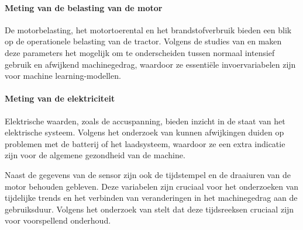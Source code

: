 \paragraph{Meting van de belasting van de motor}
De motorbelasting, het motortoerental en het brandstofverbruik bieden een blik op de operationele belasting van de tractor. Volgens de studies van \textcite{Chen2025} en \textcite{Mahale2025} maken deze parameters het mogelijk om te onderscheiden tussen normaal intensief gebruik en afwijkend machinegedrag, waardoor ze essentiële invoervariabelen zijn voor machine learning-modellen.


\paragraph{Meting van de elektriciteit}
Elektrische waarden, zoals de accuspanning, bieden inzicht in de staat van het elektrische systeem. Volgens het onderzoek van \textcite{Chen2025} kunnen afwijkingen duiden op problemen met de batterij of het laadsysteem, waardoor ze een extra indicatie zijn voor de algemene gezondheid van de machine.


Naast de gegevens van de sensor zijn ook de tijdstempel en de draaiuren van de motor behouden gebleven. Deze variabelen zijn cruciaal voor het onderzoeken van tijdelijke trends en het verbinden van veranderingen in het machinegedrag aan de gebruiksduur. Volgens het onderzoek van \textcite{Xue2025} stelt dat deze tijdsreeksen cruciaal zijn voor voorspellend onderhoud.

